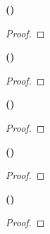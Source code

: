 \documentclass[12pt]{article}
\begin{document}
\pagestyle{fancy}
\setlength{\headheight}{14.49998pt}
\fancyfoot[C]{\thepage}

\noindent \textbf{()}

\begin{proof}
	\lipsum[1]
\end{proof}

\newpage

\noindent \textbf{()}

\begin{proof}
	\lipsum[1]
\end{proof}

\newpage

\noindent \textbf{()}

\begin{proof}
	\lipsum[1]
\end{proof}

\newpage

\noindent \textbf{()}

\begin{proof}
	\lipsum[1]
\end{proof}

\newpage

\noindent \textbf{()}

\begin{proof}
	\lipsum[1]
\end{proof}

\newpage
\end{document}
